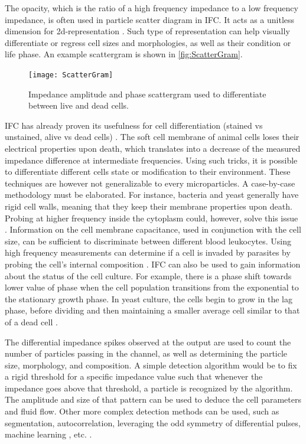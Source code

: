 The opacity, which is the ratio of a high frequency impedance to a low frequency impedance, is often used in particle scatter diagram in IFC. It acts as a unitless dimension for 2d-representation \cite{Xu2016}. Such type of representation can help visually differentiate or regress cell sizes and morphologies, as well as their condition or life phase. An example scattergram is shown in \autoref{fig:ScatterGram}. \par
\begin{figure}[h]
    \centering
    \texttt{[image: ScatterGram]}
    \caption{Impedance amplitude and phase scattergram used to differentiate between live and dead cells.\citep{Opitz2019}}
    \label{fig:ScatterGram}
\end{figure}

IFC has already proven its usefulness for cell differentiation (stained vs unstained, alive vs dead cells) \cite{Carminati2017,david2012viability, prakash2005cmos,Opitz2019}. The soft cell membrane of animal cells loses their electrical properties upon death, which translates into a decrease of the measured impedance difference at intermediate frequencies. Using such tricks, it is possible to differentiate different cells state or modification to their environment. These techniques are however not generalizable to every microparticles. A case-by-case methodology must be elaborated. For instance, bacteria and yeast generally have rigid cell walls, meaning that they keep their membrane properties upon death. Probing at higher frequency inside the cytoplasm could, however, solve this issue \cite{david2012viability,Opitz2019}. Information on the cell membrane capacitance, used in conjunction with the cell size, can be sufficient to discriminate between different blood leukocytes. Using high frequency measurements can determine if a cell is invaded by parasites by probing the cell’s internal composition \cite{Sun2010}.  IFC can also be used to gain information about the status of the cell culture. For example, there is a phase shift towards lower value of phase when the cell population transitions from the exponential to the stationary growth phase. In yeast culture, the cells begin to grow in the lag phase, before dividing and then maintaining a smaller average cell similar to that of a dead cell \cite{Opitz2019}. \par

The differential impedance spikes observed at the output are used to count the number of particles passing in the channel, as well as determining the particle size, morphology, and composition. A simple detection algorithm would be to fix a rigid threshold for a specific impedance value such that whenever the impedance goes above that threshold, a particle is recognized by the algorithm. The amplitude and size of that pattern can be used to deduce the cell parameters and fluid flow. Other more complex detection methods can be used, such as segmentation, autocorrelation, leveraging the odd symmetry of differential pulses, machine learning , etc. \cite{Carminati2017}. \par

